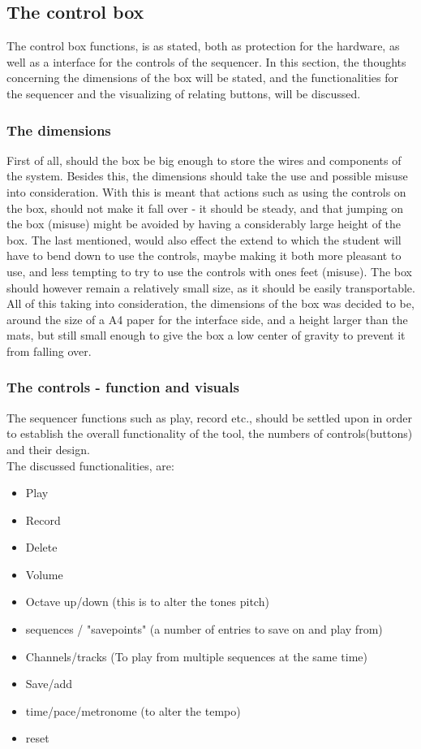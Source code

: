 \subsection{The control box}
The control box functions, is as stated, both as protection for the hardware, as well as a interface for the controls of the sequencer. In this section, the thoughts concerning the dimensions of the box will be stated, and the functionalities for the sequencer and the visualizing of relating buttons, will be discussed.

\subsubsection{The dimensions} 
First of all, should the box be big enough to store the wires and components of the system. Besides this, the dimensions should take the use and possible misuse into consideration. With this is meant that actions such as using the controls on the box, should not make it fall over - it should be steady, and that jumping on the box (misuse) might be avoided by having a considerably large height of the box. The last mentioned, would also effect the extend to which the student will have to bend down to use the controls, maybe making it both more pleasant to use, and less tempting to try to use the controls with ones feet (misuse). The box should however remain a relatively small size, as it should be easily transportable. \\ 
All of this taking into consideration, the dimensions of the box was decided to be, around the size of a A4 paper for the interface side, and a height larger than the mats, but still small enough to give the box a low center of gravity to prevent it from falling over.

\subsubsection{The controls - function and visuals} 
The sequencer functions such as play, record etc., should be settled upon in order to establish the overall functionality of the tool, the numbers of controls(buttons) and their design. \\  The discussed functionalities, are:  

\begin{itemize}
	\item Play 
	\item Record 
	\item Delete
	\item Volume
	\item Octave up/down (this is to alter the tones pitch)
	\item sequences / "savepoints" (a number of entries to save on and play from)
	\item Channels/tracks (To play from multiple sequences at the same time)
	\item Save/add
	\item time/pace/metronome (to alter the tempo)
	\item reset
\end{itemize}   

